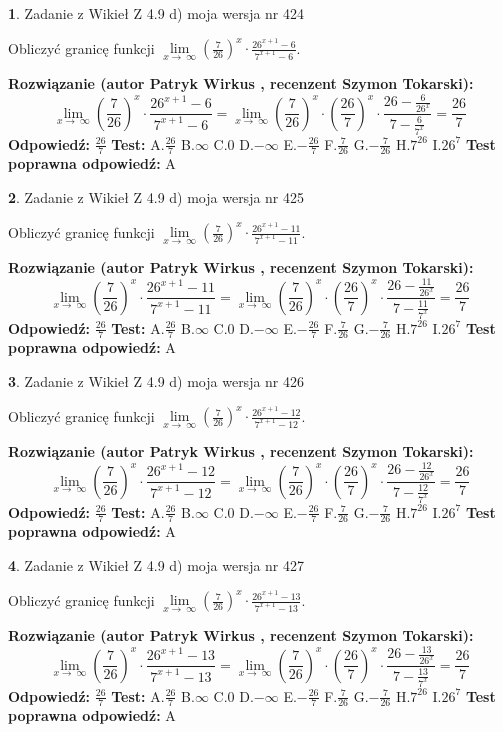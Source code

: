 \documentclass[12pt, a4paper]{article}
\theoremstyle{definition} %
\newtheorem{zad}{}
\newcommand{\zadStart}[1]{\begin{zad}#1\newline}
\newcommand{\zadStop}{\end{zad}}
\newcommand{\rozwStart}[2]{\noindent \textbf{Rozwiązanie (autor #1 , recenzent #2): }\newline}
\newcommand{\rozwStop}{\newline}
\newcommand{\odpStart}{\noindent \textbf{Odpowiedź:}\newline}
\newcommand{\odpStop}{\newline}
\newcommand{\testStart}{\noindent \textbf{Test:}\newline}
\newcommand{\testStop}{\newline}
\newcommand{\kluczStart}{\noindent \textbf{Test poprawna odpowiedź:}\newline}
\newcommand{\kluczStop}{\newline}
\begin{document}
\zadStart{Zadanie z Wikieł Z 4.9 d) moja wersja nr 424}


Obliczyć granicę funkcji  $\lim\limits_{x\to\ \infty}(\frac{7}{26})^{x}\cdot\frac{26^{x+1}-6}{7^{x+1}-6}$.
\zadStop
\rozwStart{Patryk Wirkus}{Szymon Tokarski}
$$\lim\limits_{x\to\ \infty}(\frac{7}{26})^{x}\cdot\frac{26^{x+1}-6}{7^{x+1}-6}=\lim\limits_{x\to\ \infty}(\frac{7}{26})^{x}\cdot(\frac{26}{7})^{x} \cdot \frac{26-\frac{6}{26^{x}}}{7-\frac{6}{7^{x}}} = \frac{26}{7}$$
\rozwStop
\odpStart
$\frac{26}{7}$
\odpStop
\testStart
A.$\frac{26}{7}$ B.$\infty$ C.$0$ D.$-\infty$ E.$-\frac{26}{7}$
F.$\frac{7}{26}$ G.$-\frac{7}{26}$
H.$7^{26}$
I.$26^{7}$
\testStop
\kluczStart
A
\kluczStop



\zadStart{Zadanie z Wikieł Z 4.9 d) moja wersja nr 425}


Obliczyć granicę funkcji  $\lim\limits_{x\to\ \infty}(\frac{7}{26})^{x}\cdot\frac{26^{x+1}-11}{7^{x+1}-11}$.
\zadStop
\rozwStart{Patryk Wirkus}{Szymon Tokarski}
$$\lim\limits_{x\to\ \infty}(\frac{7}{26})^{x}\cdot\frac{26^{x+1}-11}{7^{x+1}-11}=\lim\limits_{x\to\ \infty}(\frac{7}{26})^{x}\cdot(\frac{26}{7})^{x} \cdot \frac{26-\frac{11}{26^{x}}}{7-\frac{11}{7^{x}}} = \frac{26}{7}$$
\rozwStop
\odpStart
$\frac{26}{7}$
\odpStop
\testStart
A.$\frac{26}{7}$ B.$\infty$ C.$0$ D.$-\infty$ E.$-\frac{26}{7}$
F.$\frac{7}{26}$ G.$-\frac{7}{26}$
H.$7^{26}$
I.$26^{7}$
\testStop
\kluczStart
A
\kluczStop



\zadStart{Zadanie z Wikieł Z 4.9 d) moja wersja nr 426}


Obliczyć granicę funkcji  $\lim\limits_{x\to\ \infty}(\frac{7}{26})^{x}\cdot\frac{26^{x+1}-12}{7^{x+1}-12}$.
\zadStop
\rozwStart{Patryk Wirkus}{Szymon Tokarski}
$$\lim\limits_{x\to\ \infty}(\frac{7}{26})^{x}\cdot\frac{26^{x+1}-12}{7^{x+1}-12}=\lim\limits_{x\to\ \infty}(\frac{7}{26})^{x}\cdot(\frac{26}{7})^{x} \cdot \frac{26-\frac{12}{26^{x}}}{7-\frac{12}{7^{x}}} = \frac{26}{7}$$
\rozwStop
\odpStart
$\frac{26}{7}$
\odpStop
\testStart
A.$\frac{26}{7}$ B.$\infty$ C.$0$ D.$-\infty$ E.$-\frac{26}{7}$
F.$\frac{7}{26}$ G.$-\frac{7}{26}$
H.$7^{26}$
I.$26^{7}$
\testStop
\kluczStart
A
\kluczStop



\zadStart{Zadanie z Wikieł Z 4.9 d) moja wersja nr 427}


Obliczyć granicę funkcji  $\lim\limits_{x\to\ \infty}(\frac{7}{26})^{x}\cdot\frac{26^{x+1}-13}{7^{x+1}-13}$.
\zadStop
\rozwStart{Patryk Wirkus}{Szymon Tokarski}
$$\lim\limits_{x\to\ \infty}(\frac{7}{26})^{x}\cdot\frac{26^{x+1}-13}{7^{x+1}-13}=\lim\limits_{x\to\ \infty}(\frac{7}{26})^{x}\cdot(\frac{26}{7})^{x} \cdot \frac{26-\frac{13}{26^{x}}}{7-\frac{13}{7^{x}}} = \frac{26}{7}$$
\rozwStop
\odpStart
$\frac{26}{7}$
\odpStop
\testStart
A.$\frac{26}{7}$ B.$\infty$ C.$0$ D.$-\infty$ E.$-\frac{26}{7}$
F.$\frac{7}{26}$ G.$-\frac{7}{26}$
H.$7^{26}$
I.$26^{7}$
\testStop
\kluczStart
A
\kluczStop
\end{document}
